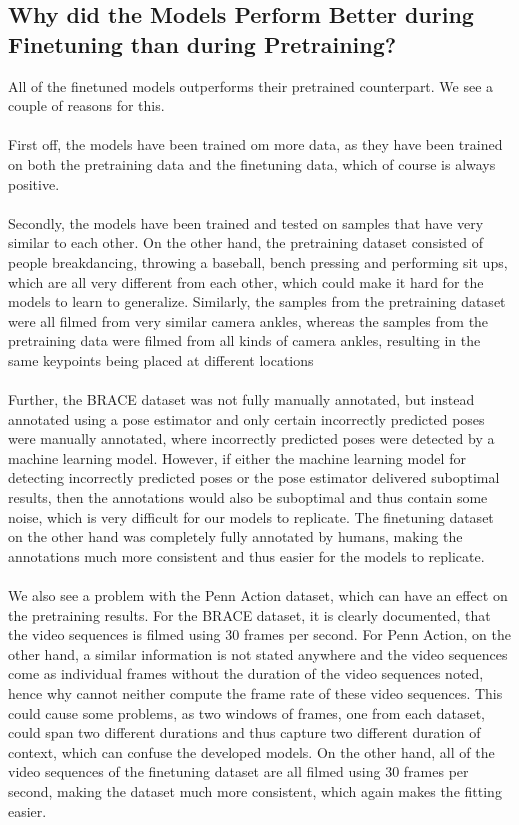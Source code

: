 \documentclass[./main.tex]{subfiles}
\begin{document}
\subsection{Why did the Models Perform Better during Finetuning than during Pretraining?}
\label{sec:pretrain_vs_finetune}
All of the finetuned models outperforms their pretrained counterpart. We see a couple of reasons for this. 
\\
\\
First off, the models have been trained om more data, as they have been trained on both the pretraining data and the finetuning data, which of course is always positive.
\\
\\
Secondly, the models have been trained and tested on samples that have very similar to each other. On the other hand, the pretraining dataset consisted of people breakdancing, throwing a baseball, bench pressing and performing sit ups, which are all very different from each other, which could make it hard for the models to learn to generalize. Similarly, the samples from the pretraining dataset were all filmed from very similar camera ankles, whereas the samples from the pretraining data were filmed from all kinds of camera ankles, resulting in the same keypoints being placed at different locations
\\
\\
Further, the BRACE dataset was not fully manually annotated, but instead annotated using a pose estimator and only certain incorrectly predicted poses were manually annotated, where incorrectly predicted poses were detected by a machine learning model. However, if either the machine learning model for detecting incorrectly predicted poses or the pose estimator delivered suboptimal results, then the annotations would also be suboptimal and thus contain some noise, which is very difficult for our models to replicate. The finetuning dataset on the other hand was completely fully annotated by humans, making the annotations much more consistent and thus easier for the models to replicate.
\\
\\
We also see a problem with the Penn Action dataset, which can have an effect on the pretraining results. For the BRACE dataset, it is clearly documented, that the video sequences is filmed using 30 frames per second. For Penn Action, on the other hand, a similar information is not stated anywhere and the video sequences come as individual frames without the duration of the video sequences noted, hence why cannot neither compute the frame rate of these video sequences. This could cause some problems, as two windows of frames, one from each dataset, could span two different durations and thus capture two different duration of context, which can confuse the developed models. On the other hand, all of the video sequences of the finetuning dataset are all filmed using 30 frames per second, making the dataset much more consistent, which again makes the fitting easier.
\end{document}
